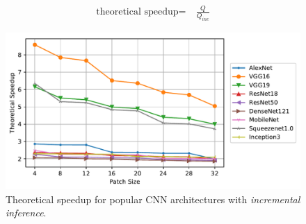\begin{align}
\label{eqn:redundancy_ratio}
\text{theoretical speedup} =&~ \frac{Q}{Q_{inc}}
\end{align}


\begin{figure}[t]
\includegraphics[width=\columnwidth]{images/redundancy_ratio}
\caption{Theoretical speedup for popular CNN architectures with \textit{incremental inference}.}
\label{fig:redundancy_ratio}
\end{figure}

